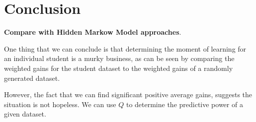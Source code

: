 \documentclass[prodmode,acmtecs]{acmsmall}
\begin{document}
\section{Conclusion}

{\bf Compare with Hidden Markow Model approaches}.

One thing that we can conclude is that determining the
moment of learning for an individual student is a murky
business, as can be seen by comparing the weighted gains for
the student dataset to the weighted gains of a 
randomly generated dataset.

However, the fact that we can find significant positive average gains,
suggests the situation is not hopeless.  We can use $Q$ to determine
the predictive power of a given dataset. 




\end{document}
